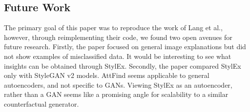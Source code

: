 \subsection{Future Work}

The primary goal of this paper was to reproduce the work of Lang et al., however, through reimplementing their code, we found two open avenues for future research. Firstly, the paper focused on general image explanations but did not show examples of misclassified data. It would be interesting to see what insights can be obtained through StylEx. Secondly, the paper compared StylEx only with StyleGAN v2 models. AttFind seems applicable to general autoencoders, and not specific to GANs. Viewing StylEx as an autoencoder, rather than a GAN seems like a promising angle for scalability to a similar counterfactual generator. 
